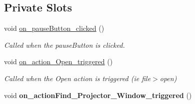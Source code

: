 \subsection*{Private Slots}
\begin{DoxyCompactItemize}
\item 
void \hyperlink{classLiveFitWindow_a182a53b15eb77f80df48a0f09c4781f5}{on\+\_\+pause\+Button\+\_\+clicked} ()\hypertarget{classLiveFitWindow_a182a53b15eb77f80df48a0f09c4781f5}{}\label{classLiveFitWindow_a182a53b15eb77f80df48a0f09c4781f5}

\begin{DoxyCompactList}\small\item\em Called when the pause\+Button is clicked. \end{DoxyCompactList}\item 
void \hyperlink{classLiveFitWindow_a19ba7fcfb7be7bb1ff8723bc8b62fc9a}{on\+\_\+action\+\_\+\+Open\+\_\+triggered} ()\hypertarget{classLiveFitWindow_a19ba7fcfb7be7bb1ff8723bc8b62fc9a}{}\label{classLiveFitWindow_a19ba7fcfb7be7bb1ff8723bc8b62fc9a}

\begin{DoxyCompactList}\small\item\em Called when the Open action is triggered (ie file$>$open) \end{DoxyCompactList}\item 
void {\bfseries on\+\_\+action\+Find\+\_\+\+Projector\+\_\+\+Window\+\_\+triggered} ()\hypertarget{classLiveFitWindow_a6cb2a964d45ef142305ea88a2c6c2a9e}{}\label{classLiveFitWindow_a6cb2a964d45ef142305ea88a2c6c2a9e}

\end{DoxyCompactItemize}
